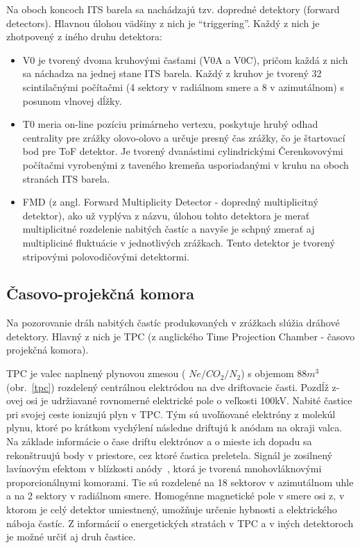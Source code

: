 \documentclass[thesismargins, thesislinespacing]{rnthesis}
\begin{document}
Na oboch koncoch ITS barela sa nachádzajú tzv. dopredné detektory (forward detectors). Hlavnou úlohou vädšiny z nich je “triggering”. Každý z nich je zhotpovený z iného druhu detektora:
\begin{itemize}
	\item V0 je tvorený dvoma kruhovými časťami (V0A a V0C), pričom každá z nich sa náchadza na jednej stane ITS barela. Každý z kruhov je tvorený 32 scintilačnými počítačmi (4 sektory v radiálnom smere a 8 v azimutálnom) s posunom vlnovej dĺžky. 
	\item T0 meria on-line pozíciu primárneho vertexu, poskytuje hrubý odhad centrality pre zrážky olovo-olovo a určuje presný čas zrážky, čo je štartovací bod pre ToF detektor. Je tvorený dvanástimi cylindrickými Čerenkovovými počítačmi vyrobenými z taveného kremeňa usporiadanými v kruhu na oboch stranách ITS barela.
	\item FMD (z angl. Forward Multiplicity Detector - dopredný multiplicitný detektor), ako už vyplýva z názvu, úlohou tohto detektora je merať multiplicitné rozdelenie nabitých častíc a navyše je schpný zmerať aj multipliciné fluktuácie v jednotlivých zrážkach. Tento detektor je tvorený stripovými polovodičovými detektormi.	 
\end{itemize}

\subsection{Časovo-projekčná komora}
\label{textTPC}
Na pozorovanie dráh nabitých častíc produkovaných v zrážkach slúžia dráhové detektory. Hlavný z nich je TPC (z anglického Time Projection Chamber - časovo projekčná komora).

TPC je valec naplnený plynovou zmesou ( $Ne/CO_2/N_2$) s objemom $88m^3$ (obr.~\ref{tpc}) rozdelený centrálnou elektródou na dve driftovacie časti. Pozdĺž z-ovej osi je udržiavané rovnomerné elektrické pole o veľkosti 100kV. Nabité častice pri svojej ceste ionizujú plyn v TPC. Tým sú uvoľňované elektróny z molekúl plynu, ktoré po krátkom vychýlení následne driftujú k anódam na okraji valca. Na základe informácie o čase driftu elektrónov a o mieste ich dopadu sa rekonštruujú body v priestore, cez ktoré častica preletela. Signál je zosilnený lavínovým efektom v blízkosti anódy~\cite{TPCobr}, ktorá je tvorená mnohovláknovými proporcionálnymi komorami. Tie sú rozdelené na 18 sektorov v azimutálnom uhle a na 2 sektory v radiálnom smere. Homogénne magnetické pole v smere osi z, v ktorom je celý detektor umiestnený, umožňuje určenie hybnosti a elektrického náboja častíc. Z informácií o energetických stratách v TPC a v iných detektoroch je možné určiť aj druh častice. 
\end{document}
